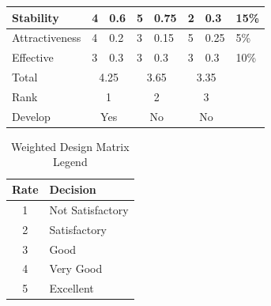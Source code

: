 \documentclass[12pt,a4paper]{article}
\begin{document}
\begin{table}[hbt!]
\begin{tabular}{|l|l|l|l|l|l|l|l|}
Stability                                                                         & 4                         & 0.6                        & 5                         & 0.75                       & 2                         & 0.3                        & 15\%                                          \\ \hline
Attractiveness                                                                    & 4                         & 0.2                        & 3                         & 0.15                       & 5                         & 0.25                       & 5\%                                           \\ \hline
Effective                                                                         & 3                         & 0.3                        & 3                         & 0.3                        & 3                         & 0.3                        & 10\%                                          \\ \hline
Total                                                                             & \multicolumn{2}{c|}{4.25}                              & \multicolumn{2}{c|}{3.65}                              & \multicolumn{2}{c|}{3.35}                              &                                               \\ \hline
Rank                                                                              & \multicolumn{2}{c|}{1}                                 & \multicolumn{2}{c|}{2}                                 & \multicolumn{2}{c|}{3}                                 &                                               \\ \hline
Develop                                                                           & \multicolumn{2}{c|}{Yes}                               & \multicolumn{2}{c|}{No}                                & \multicolumn{2}{c|}{No}                                &                                               \\ \hline
\end{tabular}
\end{table}
\newpage

\begin{table}[hbt!]
\caption{Weighted Design Matrix Legend}
\begin{tabular}{|c|l|}
\hline
Rate & Decision \\ \hline
1 & Not Satisfactory \\ \hline
2 & Satisfactory \\\hline
3 & Good \\\hline
4 & Very Good \\\hline
5 & Excellent \\\hline
\end{tabular}
\end{table}
\newpage
\end{document}
